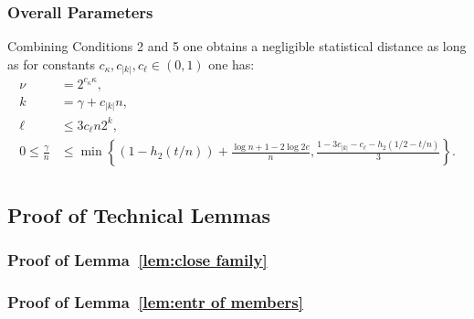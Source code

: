 \subsubsection{Overall Parameters}
Combining Conditions 2 and 5 one obtains a negligible statistical distance as long as for constants $c_\kappa, c_{|k|}, c_{\ell}\in (0,1)$ one has:
\begin{align*}
\nu &= 2^{c_{\kappa}\kappa},\\
k &=\gamma + c_{|k|}n,\\
\ell&\le 3c_{\ell}n2^k,\\
0\le \frac{\gamma}{n} &\le \min\left\{(1-h_2(t/n)) +\frac{\log{n}+1-2\log{2e}}{n}, \frac{1-3c_{|k|} - c_{\ell}-h_2(1/2-t/n)}{3}\right\}.\\
\end{align*}
%
%

\subsection{Proof of Technical Lemmas}
\label{sec:tech lemmas}
\subsubsection{Proof of Lemma~\ref{lem:close family}}



\subsubsection{Proof of Lemma~\ref{lem:entr of members}}

